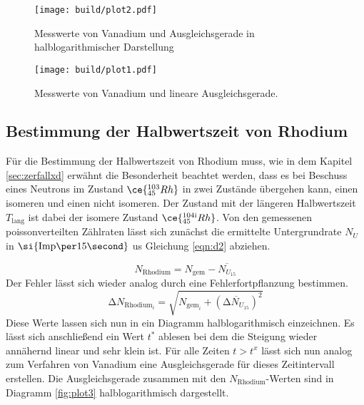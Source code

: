 
\begin{figure}[ht!]
  \centering
  \texttt{[image: build/plot2.pdf]}
  \caption{Messwerte von Vanadium und Ausgleichsgerade in halblogarithmischer Darstellung}
  \label{fig:plot2}
\end{figure}
\begin{figure}[ht!]
  \centering
  \texttt{[image: build/plot1.pdf]}
  \caption{Messwerte von Vanadium und lineare Ausgleichsgerade.}
  \label{fig:plot1}
\end{figure}

\subsection{Bestimmung der Halbwertszeit von Rhodium}
Für die Bestimmung der Halbwertszeit von Rhodium muss, wie in dem Kapitel \ref{sec:zerfallxd} erwähnt die Besonderheit beachtet werden, dass es bei Beschuss eines Neutrons
im Zustand $\ce{^{103}_{45}Rh}$ in zwei Zustände übergehen kann, einen isomeren und einen nicht isomeren. Der Zustand mit der längeren Halbwertszeit $T_{\text{lang}}$
ist dabei der isomere Zustand $\ce{^{104{\text{i}}}_{45}Rh}$. Von den gemessenen poissonverteilten Zählraten lässt sich zunächst die ermittelte Untergrundrate $N_{U}$ in $\si{{\text{Imp\per}{15}}\second}$ 
us Gleichung \ref{eqn:d2} abziehen.

\begin{equation}
N_{\text{Rhodium}} = N_{\text{gem}} - \overline{N_{U_{15}}}
\end{equation}
Der Fehler lässt sich wieder analog durch eine Fehlerfortpflanzung bestimmen.
\begin{equation}
\increment N_{{\text{Rhodium}_{i}}} = \sqrt{N_{{\text{gem}_{i}}} + (\overline{\increment N_{U_{15}}})^{2} }
\end{equation}
Diese Werte lassen sich nun in ein Diagramm halblogarithmisch einzeichnen. Es lässt sich anschließend ein Wert $t^{*}$ ablesen bei dem die Steigung wieder annähernd
linear und sehr klein ist. Für alle Zeiten $t > t^{x}$ lässt sich nun analog zum Verfahren von Vanadium eine Ausgleichsgerade für dieses Zeitintervall erstellen.
Die Ausgleichsgerade zusammen mit den $N_{\text{Rhodium}}$-Werten sind in Diagramm \ref{fig:plot3} halblogarithmisch dargestellt.

